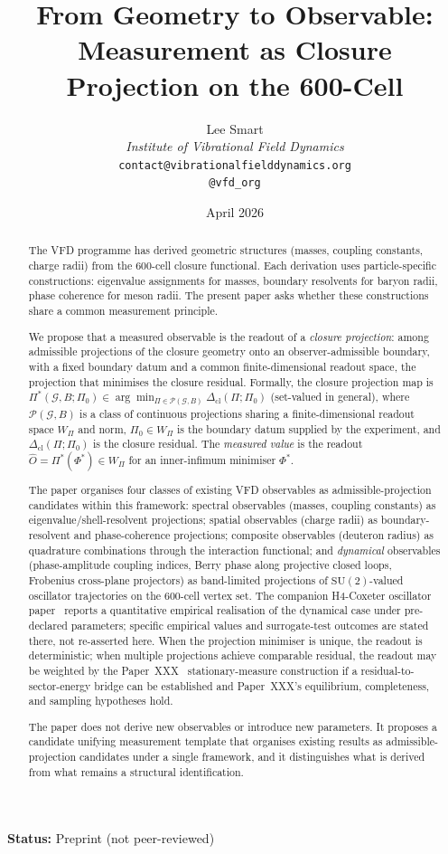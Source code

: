 \documentclass[12pt]{article}
\title{From Geometry to Observable:\\[6pt]
\large Measurement as Closure Projection on the 600-Cell}
\author{%
  Lee Smart\\[4pt]
  \textit{Institute of Vibrational Field Dynamics}\\[2pt]
  \texttt{contact@vibrationalfielddynamics.org}\\[2pt]
  \texttt{@vfd\_org}%
}
\date{April 2026}
\newcommand{\Pcal}{\mathcal{P}}
\newcommand{\Gcal}{\mathcal{G}}
\newcommand{\Dcl}{\Delta_{\mathrm{cl}}}
\begin{document}
\maketitle

\noindent\textbf{Status:} Preprint (not peer-reviewed)

\begin{abstract}
The VFD programme has derived geometric structures (masses, coupling constants, charge radii) from the 600-cell closure functional. Each derivation uses particle-specific constructions: eigenvalue assignments for masses, boundary resolvents for baryon radii, phase coherence for meson radii. The present paper asks whether these constructions share a common measurement principle.

We propose that a measured observable is the readout of a \textit{closure projection}: among admissible projections of the closure geometry onto an observer-admissible boundary, with a fixed boundary datum and a common finite-dimensional readout space, the projection that minimises the closure residual. Formally, the closure projection map is $\Pi^*(\Gcal, B; \Pi_0) \in \arg\min_{\Pi \in \Pcal(\Gcal, B)} \Dcl(\Pi; \Pi_0)$ (set-valued in general), where $\Pcal(\Gcal, B)$ is a class of continuous projections sharing a finite-dimensional readout space $W_\Pi$ and norm, $\Pi_0 \in W_\Pi$ is the boundary datum supplied by the experiment, and $\Dcl(\Pi; \Pi_0)$ is the closure residual. The \emph{measured value} is the readout $\hat{O} = \Pi^*(\Phi^*) \in W_\Pi$ for an inner-infimum minimiser $\Phi^*$.

The paper organises four classes of existing VFD observables as admissible-projection candidates within this framework: spectral observables (masses, coupling constants) as eigenvalue/shell-resolvent projections; spatial observables (charge radii) as boundary-resolvent and phase-coherence projections; composite observables (deuteron radius) as quadrature combinations through the interaction functional; and \emph{dynamical} observables (phase-amplitude coupling indices, Berry phase along projective closed loops, Frobenius cross-plane projectors) as band-limited projections of $\mathrm{SU}(2)$-valued oscillator trajectories on the 600-cell vertex set. The companion H4-Coxeter oscillator paper~\citep{H4Coxeter2026} reports a quantitative empirical realisation of the dynamical case under pre-declared parameters; specific empirical values and surrogate-test outcomes are stated there, not re-asserted here. When the projection minimiser is unique, the readout is deterministic; when multiple projections achieve comparable residual, the readout may be weighted by the Paper~XXX~\citep{SmartXXX} stationary-measure construction if a residual-to-sector-energy bridge can be established and Paper~XXX's equilibrium, completeness, and sampling hypotheses hold.

The paper does not derive new observables or introduce new parameters. It proposes a candidate unifying measurement template that organises existing results as admissible-projection candidates under a single framework, and it distinguishes what is derived from what remains a structural identification.
\end{abstract}
\end{document}
